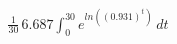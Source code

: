 \documentclass[preview]{standalone}
\begin{document}
\begin{align*}
\frac{1}{30}\,6.687\int_0^{30}e^{ln((0.931)^t)}\,dt
\end{align*}
\end{document}
